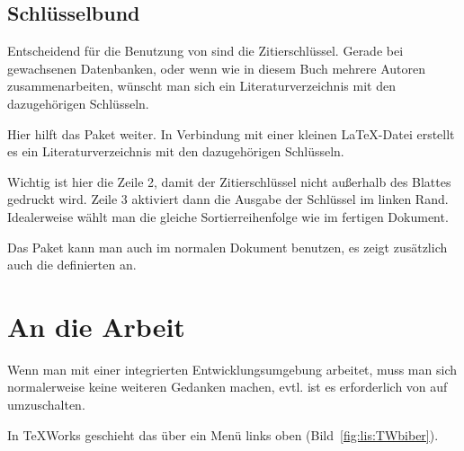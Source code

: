 \subsection{Schlüsselbund}

Entscheidend für die Benutzung von \biblatex{} sind die Zitierschlüssel.
Gerade bei gewachsenen Datenbanken,
oder wenn wie in diesem Buch mehrere Autoren zusammenarbeiten,
wünscht man sich ein Literaturverzeichnis mit den dazugehörigen Schlüsseln.

Hier hilft das Paket  weiter.
In Verbindung mit einer kleinen \LaTeX-Datei erstellt es ein Literaturverzeichnis mit den dazugehörigen Schlüsseln.


Wichtig ist hier die Zeile 2, damit der Zitierschlüssel nicht außerhalb des Blattes gedruckt wird.
Zeile 3 aktiviert dann die Ausgabe der Schlüssel im linken Rand.
Idealerweise wählt man die gleiche Sortierreihenfolge wie im fertigen Dokument.

Das Paket  kann man auch im normalen Dokument benutzen, 
es zeigt zusätzlich auch die definierten  an.

\section{An die Arbeit}

Wenn man mit einer integrierten Entwicklungsumgebung arbeitet, 
muss man sich normalerweise keine weiteren Gedanken machen,
evtl. ist es erforderlich von  auf  umzuschalten.

In TeXWorks geschieht das über ein Menü links oben (Bild~\ref{fig:lis:TWbiber}).

